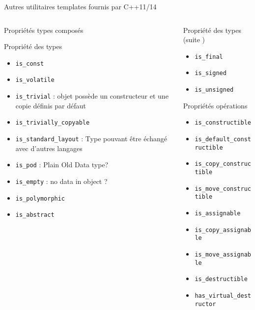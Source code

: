 \documentclass[handout,10pt]{beamer}
\begin{document}
\begin{frame}[fragile]{Autres utilitaires templates fournis par C++11/14}
\begin{columns}
\begin{column}{0.33\textwidth}
\begin{block}{Propriétés types composés}
\begin{itemize}
\end{itemize}
\end{block}
\begin{block}{Propriété des types}
\begin{itemize}
\item {\color{blue}\lstinline$is_const$}
\item {\color{blue}\lstinline$is_volatile$}
\item {\color{blue}\lstinline$is_trivial$} : objet possède un constructeur et une copie définis par défaut
\item {\color{blue}\lstinline$is_trivially_copyable$}
\item {\color{blue}\lstinline$is_standard_layout$} : Type pouvant être échangé  avec d'autres langages
\item {\color{blue}\lstinline$is_pod$} : Plain Old Data type?
\item {\color{blue}\lstinline$is_empty$} : no data in object ?
\item {\color{blue}\lstinline$is_polymorphic$}
\item {\color{blue}\lstinline$is_abstract$}
\end{itemize}
\end{block}
\end{column}
\begin{column}{0.33\textwidth}
\begin{block}{Propriété des types  (suite )}
\begin{itemize}
\item {\color{red}\lstinline$is_final$}
\item {\color{blue}\lstinline$is_signed$}
\item {\color{blue}\lstinline$is_unsigned$}
\end{itemize}
\end{block}
\begin{block}{Propriétés opérations}
\begin{itemize}
\item {\color{blue}\lstinline$is_constructible$}
\item {\color{blue}\lstinline$is_default_constructible$}
\item {\color{blue}\lstinline$is_copy_constructible$}
\item {\color{blue}\lstinline$is_move_constructible$}
\item {\color{blue}\lstinline$is_assignable$}
\item {\color{blue}\lstinline$is_copy_assignable$}
\item {\color{blue}\lstinline$is_move_assignable$}
\item {\color{blue}\lstinline$is_destructible$}
\item {\color{blue}\lstinline$has_virtual_destructor$}
\end{itemize}
\end{block}
\end{column}
\end{columns}
\end{frame}
\end{document}
